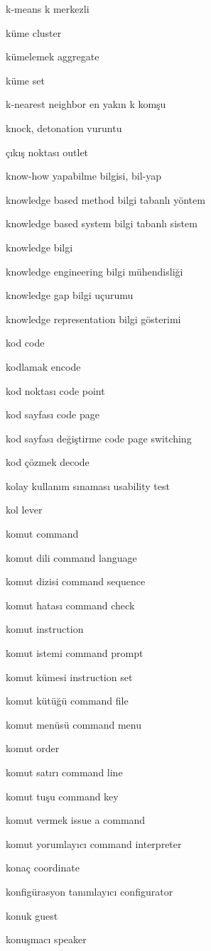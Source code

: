 \documentclass[12pt,fleqn]{article}\usepackage{../../common}
\begin{document}
k-means k merkezli

küme cluster

kümelemek aggregate

küme set

k-nearest neighbor en yakın k komşu

knock, detonation vuruntu

çıkış noktası outlet

know-how yapabilme bilgisi, bil-yap

knowledge based method bilgi tabanlı yöntem

knowledge based system bilgi tabanlı sistem

knowledge bilgi

knowledge engineering bilgi mühendisliği

knowledge gap bilgi uçurumu

knowledge representation bilgi gösterimi

kod code

kodlamak encode

kod noktası code point

kod sayfası code page

kod sayfası değiştirme code page switching

kod çözmek decode

kolay kullanım sınaması usability test

kol lever

komut command

komut dili command language

komut dizisi command sequence

komut hatası command check

komut instruction

komut istemi command prompt

komut kümesi instruction set

komut kütüğü command file

komut menüsü command menu

komut order

komut satırı command line

komut tuşu command key

komut vermek issue a command

komut yorumlayıcı command interpreter

konaç coordinate

konfigürasyon tanımlayıcı configurator

konuk guest

konuşmacı speaker
\end{document}

